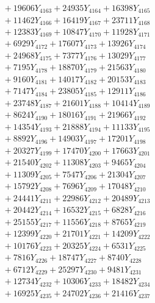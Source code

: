 \documentclass[a4paper,10pt]{article}
\begin{document}
{\begin{align}
&\;  + 19606 Y_{4163} + 24935 Y_{4164} + 16398 Y_{4165} \\[0.3ex]
&\;  + 11462 Y_{4166} + 16419 Y_{4167} + 23711 Y_{4168} \\[0.5ex]\allowbreak
&\;  + 12383 Y_{4169} + 10847 Y_{4170} + 11928 Y_{4171} \\[0.3ex]
&\;  + 6929 Y_{4172} + 17607 Y_{4173} + 13926 Y_{4174} \\[0.3ex]
&\;  + 24968 Y_{4175} + 7377 Y_{4176} + 13029 Y_{4177} \\[0.3ex]
&\;  + 7195 Y_{4178} + 18870 Y_{4179} + 21563 Y_{4180} \\[0.3ex]
&\;  + 9160 Y_{4181} + 14017 Y_{4182} + 20153 Y_{4183} \\[0.3ex]
&\;  + 7147 Y_{4184} + 23805 Y_{4185} + 12911 Y_{4186} \\[0.3ex]
&\;  + 23748 Y_{4187} + 21601 Y_{4188} + 10414 Y_{4189} \\[0.3ex]
&\;  + 8624 Y_{4190} + 18016 Y_{4191} + 21966 Y_{4192} \\[0.3ex]
&\;  + 14354 Y_{4193} + 21888 Y_{4194} + 11133 Y_{4195} \\[0.3ex]
&\;  + 8892 Y_{4196} + 14903 Y_{4197} + 17201 Y_{4198} \\[0.5ex]\allowbreak
&\;  + 20327 Y_{4199} + 17470 Y_{4200} + 17663 Y_{4201} \\[0.3ex]
&\;  + 21540 Y_{4202} + 11308 Y_{4203} + 9465 Y_{4204} \\[0.3ex]
&\;  + 11309 Y_{4205} + 7547 Y_{4206} + 21304 Y_{4207} \\[0.3ex]
&\;  + 15792 Y_{4208} + 7696 Y_{4209} + 17048 Y_{4210} \\[0.3ex]
&\;  + 24441 Y_{4211} + 22986 Y_{4212} + 20489 Y_{4213} \\[0.3ex]
&\;  + 20442 Y_{4214} + 16532 Y_{4215} + 6828 Y_{4216} \\[0.3ex]
&\;  + 25155 Y_{4217} + 11556 Y_{4218} + 8765 Y_{4219} \\[0.3ex]
&\;  + 12399 Y_{4220} + 21701 Y_{4221} + 14209 Y_{4222} \\[0.3ex]
&\;  + 10176 Y_{4223} + 20325 Y_{4224} + 6531 Y_{4225} \\[0.3ex]
&\;  + 7816 Y_{4226} + 18747 Y_{4227} + 8740 Y_{4228} \\[0.5ex]\allowbreak
&\;  + 6712 Y_{4229} + 25297 Y_{4230} + 9481 Y_{4231} \\[0.3ex]
&\;  + 12734 Y_{4232} + 10306 Y_{4233} + 18482 Y_{4234} \\[0.3ex]
&\;  + 16925 Y_{4235} + 24702 Y_{4236} + 21416 Y_{4237} \\[0.3ex]

\end{align}}
\end{document}
